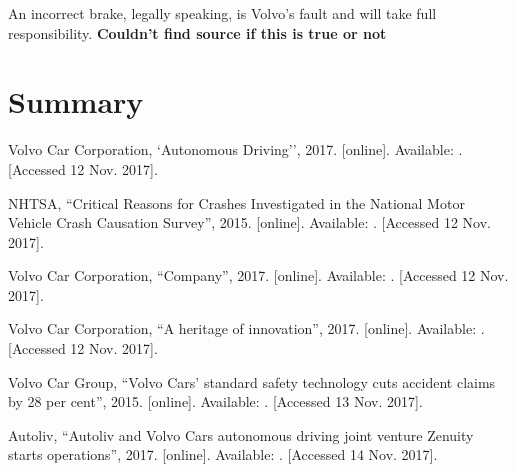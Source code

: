 \documentclass[conference]{IEEEtran}
\begin{document}
An incorrect brake, legally speaking, is Volvo's fault and will take full responsibility. \textbf{Couldn't find source if this is true or not}


\section{Summary}


\begin{thebibliography}{00}
	Volvo Car Corporation,
	`Autonomous Driving'',
	2017.
	[online]. Available: .
	[Accessed 12 Nov. 2017].
	
	NHTSA,
	``Critical Reasons for Crashes Investigated in the National Motor Vehicle Crash Causation Survey'',
	2015.
	[online]. Available: .
	[Accessed 12 Nov. 2017].
	
	Volvo Car Corporation,
	``Company'',
	2017.
	[online]. Available: 
	.
	[Accessed 12 Nov. 2017].
	
	Volvo Car Corporation,
	``A heritage of innovation'',
	2017.
	[online]. Available: .
	[Accessed 12 Nov. 2017].
	
	Volvo Car Group,
	``Volvo Cars' standard safety technology cuts accident claims by 28 per cent'',
	2015.
	[online]. Available: .
	[Accessed 13 Nov. 2017].
	
	Autoliv,
	``Autoliv and Volvo Cars autonomous driving joint venture Zenuity starts operations'',
	2017.
	[online]. Available: .
	[Accessed 14 Nov. 2017].
	

\end{thebibliography}
\end{document}
